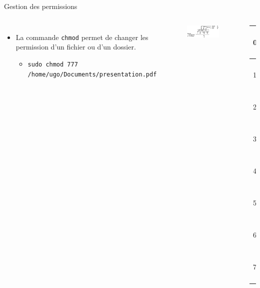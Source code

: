 \documentclass[aspectratio=169,xcolor=dvipsnames]{beamer}
\begin{document}
\begin{frame}{Gestion des permissions}
    \begin{columns}[c] %

        \begin{itemize}
            \item La commande \texttt{chmod} permet de changer les permission d'un fichier ou d'un dossier.
            \begin{itemize}
                \item \texttt{sudo chmod 777 /home/ugo/Documents/presentation.pdf}
            \end{itemize}
        \end{itemize}

        \begin{columns}[c] %
            \begin{figure}
                \includegraphics[width=1\textwidth]{images/chmod.png}
            \end{figure}

            \begin{table}[]
            \begin{tabular}{|l|l|}
            \hline
            0 & - - - \\ \hline
            1 & - - x \\ \hline
            2 & - w - \\ \hline
            3 & - w x \\ \hline
            4 & r - - \\ \hline
            5 & r - x \\ \hline
            6 & r w - \\ \hline
            7 & r w x \\ \hline
            \end{tabular}
            \end{table}
        \end{columns}
    \end{columns}
\end{frame}
\end{document}
